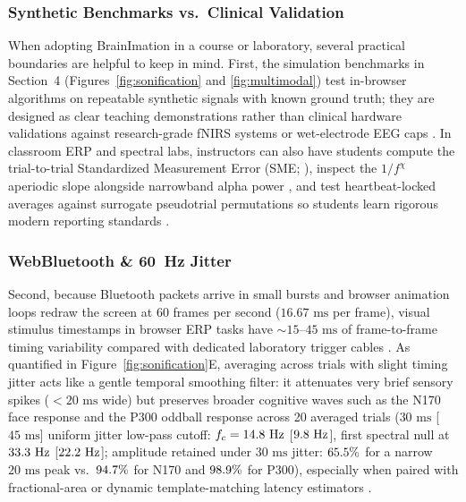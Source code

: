 \documentclass[11pt]{article}
\begin{document}
\subsubsection{Synthetic Benchmarks vs.\ Clinical Validation}
When adopting BrainImation in a course or laboratory, several practical boundaries are helpful to keep in mind. First, the simulation benchmarks in Section~4 (Figures~\ref{fig:sonification} and \ref{fig:multimodal}) test in-browser algorithms on repeatable synthetic signals with known ground truth; they are designed as clear teaching demonstrations rather than clinical hardware validations against research-grade fNIRS systems or wet-electrode EEG caps \citep{cannard2021validating,sabio2024scoping,vanbueren2026comparing,russo2025fnirs}. In classroom ERP and spectral labs, instructors can also have students compute the trial-to-trial Standardized Measurement Error (SME; \citealp{luck2021standardized,schubert2023enhancing}), inspect the $1/f^{\chi}$ aperiodic slope alongside narrowband alpha power \citep{vanbueren2026comparing}, and test heartbeat-locked averages against surrogate pseudotrial permutations \citep{steinfath2025validating} so students learn rigorous modern reporting standards \citep{picton2000guidelines,keil2014committee}.

\subsubsection{WebBluetooth \& 60~Hz Jitter}
Second, because Bluetooth packets arrive in small bursts and browser animation loops redraw the screen at 60 frames per second ($16.67\text{ ms}$ per frame), visual stimulus timestamps in browser ERP tasks have $\sim 15\text{--}45\text{ ms}$ of frame-to-frame timing variability compared with dedicated laboratory trigger cables \citep{krigolson2017choosing,kuziek2017transitioning,kuziek2018increasing,pronk2020mental,anwyl2021realistic,lukacs2023precise}. As quantified in Figure~\ref{fig:sonification}E, averaging across trials with slight timing jitter acts like a gentle temporal smoothing filter: it attenuates very brief sensory spikes ($<20\text{ ms}$ wide) but preserves broader cognitive waves such as the N170 face response and the P300 oddball response across 20 averaged trials ($30\text{ ms}$ [$45\text{ ms}$] uniform jitter low-pass cutoff: $f_c = 14.8\text{ Hz}$ [$9.8\text{ Hz}$], first spectral null at $33.3\text{ Hz}$ [$22.2\text{ Hz}$]; amplitude retained under $30\text{ ms}$ jitter: $65.5\%$ for a narrow $20\text{ ms}$ peak vs.\ $94.7\%$ for N170 and $98.9\%$ for P300), especially when paired with fractional-area or dynamic template-matching latency estimators \citep{schubert2024multiverse,schubert2026dynamic}.
\end{document}

